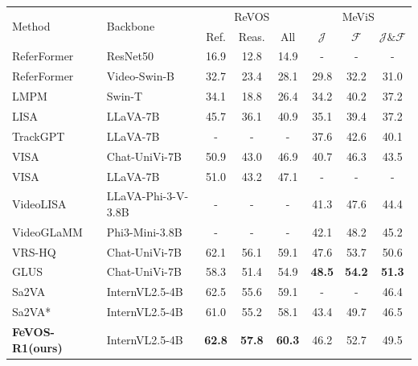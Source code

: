 \documentclass[preview,border=8pt]{standalone}
\newcommand{\method}{FeVOS-R1\xspace}
\begin{document}
\begin{minipage}{0.98\linewidth}
\centering
\small
\renewcommand\arraystretch{1.0}
\setlength{\tabcolsep}{3.7pt}
\begin{tabular}{l|l|ccc|ccc}
\toprule
\multirow{2}{*}{Method} & \multirow{2}{*}{Backbone} & \multicolumn{3}{c|}{ReVOS} & \multicolumn{3}{c}{MeViS} \\
& & Ref. & Reas. & All & $\mathcal{J}$ & $\mathcal{F}$ & $\mathcal{J}\&\mathcal{F}$ \\
\hline
ReferFormer & ResNet50 & 16.9 & 12.8 & 14.9 & - & - & - \\
ReferFormer & Video-Swin-B & 32.7 & 23.4 & 28.1 & 29.8 & 32.2 & 31.0 \\
LMPM & Swin-T & 34.1 & 18.8 & 26.4 & 34.2 & 40.2 & 37.2 \\
LISA & LLaVA-7B & 45.7 & 36.1 & 40.9 & 35.1 & 39.4 & 37.2 \\
TrackGPT & LLaVA-7B & - & - & - & 37.6 & 42.6 & 40.1 \\
VISA & Chat-UniVi-7B & 50.9 & 43.0 & 46.9 & 40.7 & 46.3 & 43.5 \\
VISA & LLaVA-7B & 51.0 & 43.2 & 47.1 & - & - & - \\
VideoLISA & LLaVA-Phi-3-V-3.8B & - & - & - & 41.3 & 47.6 & 44.4 \\
VideoGLaMM & Phi3-Mini-3.8B & - & - & - & 42.1 & 48.2 & 45.2 \\
VRS-HQ & Chat-UniVi-7B & 62.1 & 56.1 & 59.1 & 47.6 & 53.7 & 50.6 \\
GLUS & Chat-UniVi-7B & 58.3 & 51.4 & 54.9 & \textbf{48.5} & \textbf{54.2} & \textbf{51.3} \\
Sa2VA & InternVL2.5-4B & 62.5 & 55.6 & 59.1 & - & - & 46.4 \\
Sa2VA* & InternVL2.5-4B & 61.0 & 55.2 & 58.1 & 43.4 & 49.7 & 46.5 \\
\hline
\textbf{\method (ours)} & InternVL2.5-4B & \textbf{62.8} & \textbf{57.8} & \textbf{60.3} & 46.2 & 52.7 & 49.5 \\
\bottomrule
\end{tabular}
\end{minipage}
\end{document}
